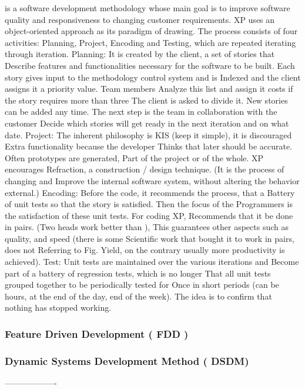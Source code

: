 is a software development methodology whose main goal is to improve software quality and responsiveness to changing customer requirements. 
XP uses an object-oriented approach as its paradigm of
drawing. The process consists of four activities: Planning, Project,
Encoding and Testing, which are repeated iterating through iteration.
Planning: It is created by the client, a set of stories that
Describe features and functionalities necessary for the software to be
built. Each story gives input to the methodology control system and is
Indexed and the client assigns it a priority value. Team members
Analyze this list and assign it costs if the story requires more than three
The client is asked to divide it. New stories can be added
any time. The next step is the team in collaboration with the customer
Decide which stories will get ready in the next iteration and on what date.
Project: The inherent philosophy is KIS (keep it simple), it is discouraged
Extra functionality because the developer
Thinks that later should be accurate. Often prototypes are generated,
Part of the project or of the whole. XP encourages
Refraction, a construction / design technique. (It is the process of changing and
Improve the internal software system, without altering the behavior
external.)
Encoding: Before the code, it recommends the process, that a
Battery of unit tests so that the story is satisfied. Then the focus of the
Programmers is the satisfaction of these unit tests. For coding XP,
Recommends that it be done in pairs. (Two heads work better than
), This guarantees other aspects such as quality, and speed (there is some
Scientific work that bought it to work in pairs, does not
Referring to Fig.
Yield, on the contrary usually more productivity is achieved).
Test: Unit tests are maintained over the various iterations and
Become part of a battery of regression tests, which is no longer
That all unit tests grouped together to be periodically tested for
Once in short periods (can be hours, at the end of the day, end of the week).
The idea is to confirm that nothing has stopped working.

\subsubsection{Feature Driven Development ( FDD )}
\subsubsection{Dynamic Systems Development Method ( DSDM) }
-------------------\\



